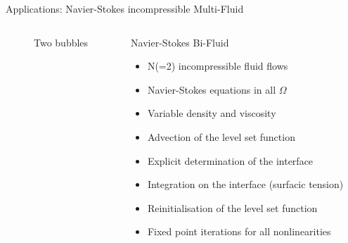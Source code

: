 \documentclass[final,utf8,,hyperref={pdfpagelabels=false}]{beamer}
\newcommand{\goodgap}{%
  \hspace{\subfigtopskip}%
  \hspace{\subfigbottomskip}}
\begin{document}
\begin{frame}[containsverbatim]{}
\begin{columns}[t]
\begin{block}{Applications: Navier-Stokes incompressible Multi-Fluid}
\begin{columns}[t]
\begin{column}{.45\textwidth}
\begin{figure}
      \goodgap
      \caption{Two bubbles}
      \label{fig:1}
    \end{figure}
      \end{column}
      \begin{column}{.52\textwidth}
          \begin{block}{Navier-Stokes Bi-Fluid}
            \begin{itemize}
            \item N(=2) incompressible fluid flows
            \item Navier-Stokes equations in all  $\Omega$
            \item Variable density and viscosity
              
            \item Advection of the level set function
            \item Explicit determination of the interface
            \item Integration on the interface (surfacic tension)
            \item Reinitialisation of the  level set function
              
            \item Fixed point iterations for all nonlinearities
              

\end{itemize}
\end{block}
\end{column}
\end{columns}
\end{block}
\end{columns}
\end{frame}
\end{document}
